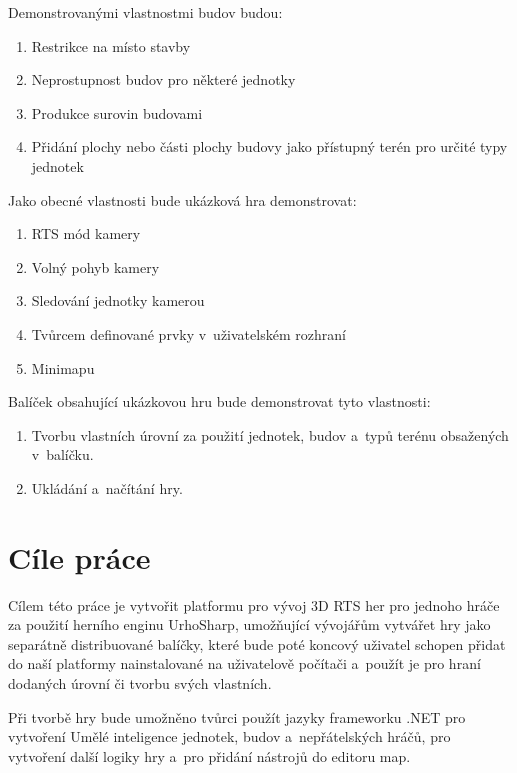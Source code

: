 Demonstrovanými vlastnostmi budov budou:
\begin{enumerate}
	\item Restrikce na místo stavby
	\item Neprostupnost budov pro některé jednotky
	\item Produkce surovin budovami
	\item Přidání plochy nebo části plochy budovy jako přístupný terén pro určité typy jednotek
\end{enumerate}

Jako obecné vlastnosti bude ukázková hra demonstrovat:
\begin{enumerate}
	\item RTS mód kamery
	\item Volný pohyb kamery
	\item Sledování jednotky kamerou
	\item Tvůrcem definované prvky v~uživatelském rozhraní
	\item Minimapu
\end{enumerate}

Balíček obsahující ukázkovou hru bude demonstrovat tyto vlastnosti:
\begin{enumerate}
	\item Tvorbu vlastních úrovní za použití jednotek, budov a~typů terénu obsažených v~balíčku.
	\item Ukládání a~načítání hry.
\end{enumerate}

\section{Cíle práce}
\label{sec:cileprace}
Cílem této práce je vytvořit platformu pro vývoj 3D RTS her pro jednoho hráče za použití herního enginu UrhoSharp, umožňující vývojářům vytvářet hry jako separátně 
distribuované balíčky, které bude poté koncový uživatel schopen přidat do naší platformy nainstalované na uživatelově počítači a~použít je pro hraní dodaných úrovní či tvorbu svých vlastních.

Při tvorbě hry bude umožněno tvůrci použít jazyky frameworku .NET  pro vytvoření Umělé inteligence jednotek, budov a~nepřátelských hráčů, pro vytvoření další logiky hry a~pro přidání nástrojů do editoru map. 

